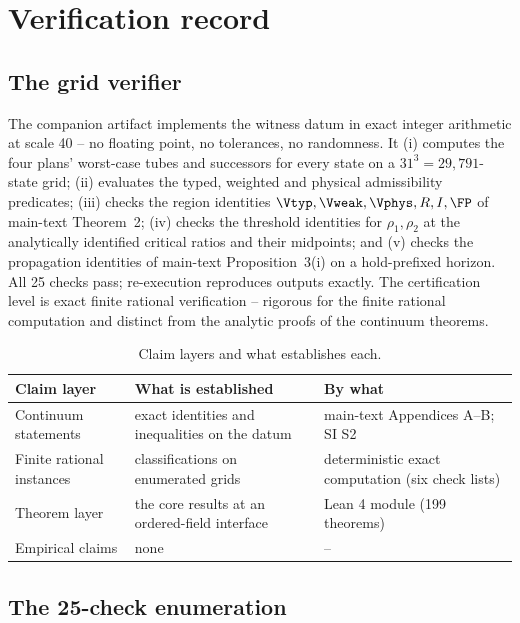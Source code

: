 \section{Verification record}\label{si:verification}

\subsection{The grid verifier}

The companion artifact implements the witness datum in exact integer arithmetic at scale 40 -- no floating point, no tolerances, no randomness. It (i) computes the four plans' worst-case tubes and successors for every state on a $31^3=29{,}791$-state grid; (ii) evaluates the typed, weighted and physical admissibility predicates; (iii) checks the region identities $\Vtyp,\Vweak,\Vphys,R,I,\FP$ of main-text Theorem~2; (iv) checks the threshold identities for $\rho_1,\rho_2$ at the analytically identified critical ratios and their midpoints; and (v) checks the propagation identities of main-text Proposition~3(i) on a hold-prefixed horizon. All 25 checks pass; re-execution reproduces outputs exactly. The certification level is exact finite rational verification -- rigorous for the finite rational computation and distinct from the analytic proofs of the continuum theorems.

\begin{table}[!htbp]
\centering\small
\caption{Claim layers and what establishes each.}
\begin{tabularx}{\textwidth}{@{}>{\raggedright\arraybackslash}p{}XX@{}}
\toprule
Claim layer & What is established & By what \\
\midrule
Continuum statements & exact identities and inequalities on the datum & main-text Appendices A--B; SI S2 \\
Finite rational instances & classifications on enumerated grids & deterministic exact computation (six check lists) \\
Theorem layer & the core results at an ordered-field interface & Lean 4 module (199 theorems) \\
Empirical claims & none & -- \\
\bottomrule
\end{tabularx}
\end{table}

\subsection{The 25-check enumeration}

